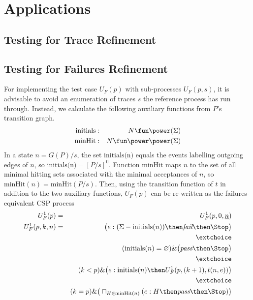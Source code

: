 \section{Applications}
\label{sec:case}




\subsection{Testing for Trace Refinement}
 



\subsection{Testing for Failures Refinement}

For implementing the test case $U_F(p)$ with sub-processes $U_F(p,s)$, 
it is advisable to avoid an enumeration
of traces $s$ the reference process has run through. Instead, we calculate
the following auxiliary functions from $P$'s transition graph.
\begin{eqnarray*}
\text{initials} & : & N \fun \power (\Sigma) 
\\
\text{minHit} & : & N \fun \power\power(\Sigma)
\end{eqnarray*}
In a state $n = G(P)/s$, the set $\text{initials(n)}$ equals the events labelling
outgoing edges of $n$, so  $\text{initials(n)} = [P/s]^0$. Function $\text{minHit}$
maps $n$ to the set of all minimal hitting sets associated with the minimal acceptances
of $n$, so $\text{minHit}(n) = \text{minHit}(P/s)$. Then, using the transition function
of $t$ in addition to the two auxiliary functions, $U_F(p)$ can be re-written
as the failures-equivalent CSP process
\begin{eqnarray}
U_F^1(p) & = & U_F^1(p,0,\ii n)
\\
U_F^1(p,k,n) & = & \big( e:(\Sigma - \text{initials}(n)) \then \efail\then \Stop \big)
\label{eq:xufa}
\\ & & \extchoice \nonumber
\\ & & (\text{initials}(n) = \varnothing)    \&   \big( \epass \then \Stop \big)
\label{eq:xufb}
\\ & & \extchoice \nonumber
\\ & & (k < p) \& \big( e:\text{initials}(n) \then U_F^1(p,(k+1),t(n,e)) \big)
\label{eq:xufc}
\\ & & \extchoice \nonumber
\\ & & (k = p) \& \big( \sqcap_{H\in\text{minHit}(n)} ( e:H \then \epass \then\Stop   )  \big)
\label{eq:xufd}
\end{eqnarray}



